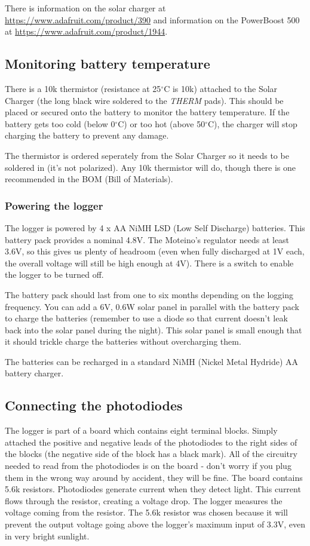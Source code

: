 \documentclass[10pt]{article}
\begin{document}
There is information on the solar charger at \url{https://www.adafruit.com/product/390} and information on the PowerBoost 500 at \url{https://www.adafruit.com/product/1944}.

\subsection{Monitoring battery temperature}

There is a 10k thermistor (resistance at 25$^{\circ}$C is 10k) attached to the Solar Charger (the long black wire soldered to the \textit{THERM} pads). This should be placed or secured onto the battery to monitor the battery temperature. If the battery gets too cold (below 0$^{\circ}$C) or too hot (above 50$^{\circ}$C), the charger will stop charging the battery to prevent any damage.

The thermistor is ordered seperately from the Solar Charger so it needs to be soldered in (it's not polarized). Any 10k thermistor will do, though there is one recommended in the BOM (Bill of Materials).

\subsubsection{Powering the logger}

The logger is powered by 4 x AA NiMH LSD (Low Self Discharge) batteries. This battery pack provides a nominal 4.8V. The Moteino's regulator needs at least 3.6V, so this gives us plenty of headroom (even when fully discharged at 1V each, the overall voltage will still be high enough at 4V). There is a switch to enable the logger to be turned off.

The battery pack should last from one to six months depending on the logging frequency. You can add a 6V, 0.6W solar panel in parallel with the battery pack to charge the batteries (remember to use a diode so that current doesn't leak back into the solar panel during the night). This solar panel is small enough that it should trickle charge the batteries without overcharging them.

The batteries can be recharged in a standard NiMH (Nickel Metal Hydride) AA battery charger.

\subsection{Connecting the photodiodes}

The logger is part of a board which contains eight terminal blocks. Simply attached the positive and negative leads of the photodiodes to the right sides of the blocks (the negative side of the block has a black mark). All of the circuitry needed to read from the photodiodes is on the board - don't worry if you plug them in the wrong way around by accident, they will be fine. The board contains 5.6k resistors. Photodiodes generate current when they detect light. This current flows through the resistor, creating a voltage drop. The logger measures the voltage coming from the resistor. The 5.6k resistor was chosen because it will prevent the output voltage going above the logger's maximum input of 3.3V, even in very bright sunlight.
\end{document}
